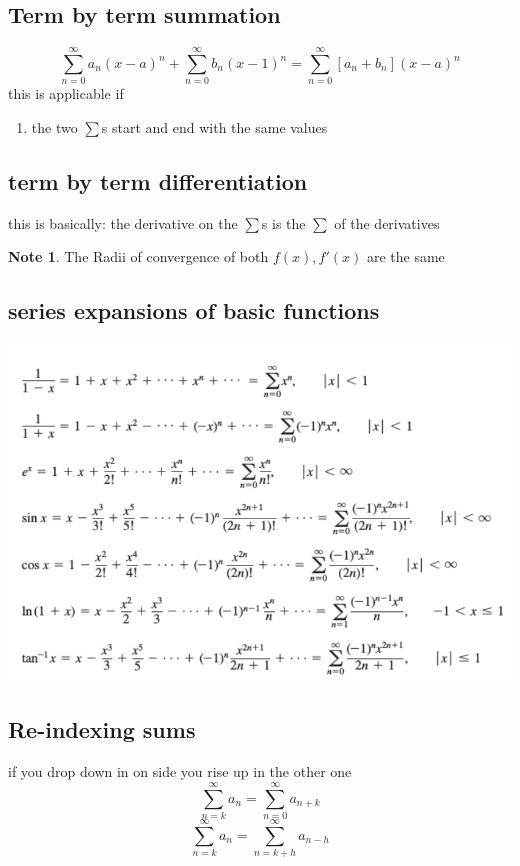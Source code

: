 \documentclass[11pt]{article}
\theoremstyle{definition}
\newtheorem{note}{Note}
\begin{document}
\subsection{Term by term summation}
\begin{equation}
	\sum_{n=0}^{\infty} a_n (x-a)^n + \sum_{n=0}^{\infty} b_n(x-1)^n = \sum_{n=0}^{\infty} [a_n+b_n] (x-a)^n
\end{equation}
this is applicable if \begin{enumerate}

\item the two $\sum$s start and end with the same values

\end{enumerate}
\subsection{term by term differentiation}
this is basically: the derivative on the $\sum$s is the $\sum$ of the derivatives  
\begin{note}
	The Radii of convergence of both $f(x), f'(x)$ are the same 
\end{note}
\subsection{series expansions of basic functions}
\includegraphics[scale=0.5]{images/img1.png}
\subsection{Re-indexing sums}
if you drop down in on side you rise up in the other one 
\begin{equation}
\sum_{n=k}^{\infty} a_n = \sum_{n=0}^{\infty} a_{n+k} 
\end{equation}
\begin{equation}
\sum_{n=k}^{\infty} a_n = \sum_{n=k+h}^{\infty} a_{n-h} 
\end{equation}
\end{document}

